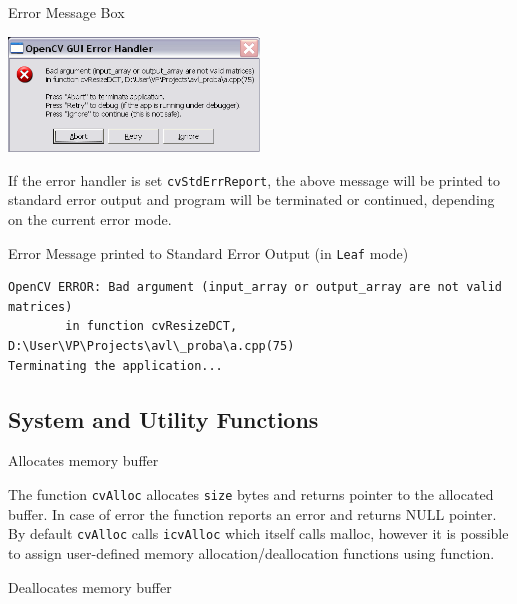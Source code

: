 Error Message Box

\includegraphics[width=0.5\textwidth]{pics/errmsg.png}

If the error handler is set \texttt{cvStdErrReport}, the above message will be printed to standard error output and program will be terminated or continued, depending on the current error mode.

Error Message printed to Standard Error Output (in \texttt{Leaf} mode)

\begin{verbatim}
OpenCV ERROR: Bad argument (input_array or output_array are not valid matrices)
        in function cvResizeDCT, D:\User\VP\Projects\avl\_proba\a.cpp(75)
Terminating the application...
\end{verbatim}

\subsection{System and Utility Functions}

\label{Alloc}

Allocates memory buffer


\begin{description}
\end{description}

The function \texttt{cvAlloc} allocates \texttt{size} bytes and returns
pointer to the allocated buffer. In case of error the function reports an
error and returns NULL pointer. By default \texttt{cvAlloc} calls
\texttt{icvAlloc} which
itself calls malloc, however it is possible to assign user-defined memory
allocation/deallocation functions using  function.

\label{Free}

Deallocates memory buffer


\begin{description}
\end{description}

